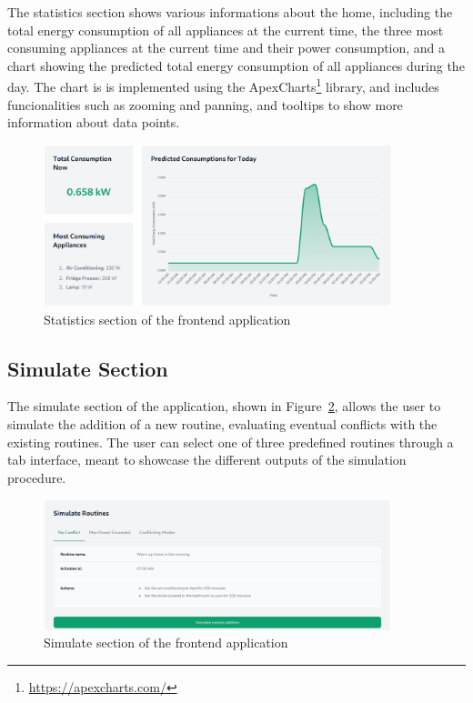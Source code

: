 The statistics section shows various informations about the home, including the total energy consumption of all appliances at the current time, the three most consuming appliances at the current time and their power consumption, and a chart showing the predicted total energy consumption of all appliances during the day. The chart is is implemented using the ApexCharts\footnote{\url{https://apexcharts.com/}} library, and includes funcionalities such as zooming and panning, and tooltips to show more information about data points.

\begin{figure}
    \centering
    \includegraphics[width=0.9\textwidth]{images/frontend/statistics.png}
    \caption{Statistics section of the frontend application}
    \label{fig:frontend_statistics}
\end{figure}

\subsection{Simulate Section}

The simulate section of the application, shown in Figure~\ref{fig:frontend_simulate}, allows the user to simulate the addition of a new routine, evaluating eventual conflicts with the existing routines. The user can select one of three predefined routines through a tab interface, meant to showcase the different outputs of the simulation procedure.

\begin{figure}
    \centering
    \includegraphics[width=0.9\textwidth]{images/frontend/simulate.png}
    \caption{Simulate section of the frontend application}
    \label{fig:frontend_simulate}
\end{figure}

